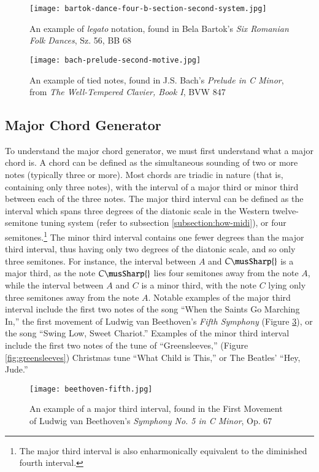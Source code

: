 \begin{figure}[h]
  \centering
  \texttt{[image: bartok-dance-four-b-section-second-system.jpg]}
  \caption{An example of \textit{legato} notation, found in Bela Bartok's \textit{Six Romanian Folk Dances}, Sz. 56, BB 68}
  \label{fig:legato-notes-example}
\end{figure}

\begin{figure}[h]
  \centering
  \texttt{[image: bach-prelude-second-motive.jpg]}
  \caption{An example of tied notes, found in J.S. Bach's \textit{Prelude in C Minor}, from \textit{The Well-Tempered Clavier, Book I}, BVW 847}
  \label{fig:tied-notes-example}
\end{figure}

\subsection{Major Chord Generator}

To understand the major chord generator, we must first understand what a major chord is. A chord can be defined as the simultaneous sounding of two or more notes (typically three or more). Most chords are triadic in nature (that is, containing only three notes), with the interval of a major third or minor third between each of the three notes. The major third interval can be defined as the interval which spans three degrees of the diatonic scale in the Western twelve-semitone tuning system (refer to subsection \ref{subsection:how-midi}), or four semitones.\footnote{The major third interval is also enharmonically equivalent to the diminished fourth interval.} The minor third interval contains one fewer degrees than the major third interval, thus having only two degrees of the diatonic scale, and so only three semitones. For instance, the interval between $A$ and $C\musSharp{}$ is a major third, as the note $C\musSharp{}$ lies four semitones away from the note $A$, while the interval between $A$ and $C$ is a minor third, with the note $C$ lying only three semitones away from the note $A$. Notable examples of the major third interval include the first two notes of the song ``When the Saints Go Marching In,'' the first movement of Ludwig van Beethoven's \textit{Fifth Symphony} (Figure \ref{fig:beethoven-fifth}\cite{Beethoven_1862}), or the song ``Swing Low, Sweet Chariot.'' Examples of the minor third interval include the first two notes of the tune of ``Greensleeves,'' (Figure \ref{fig:greensleeves}\cite{Kurtz_2010}) Christmas tune ``What Child is This,'' or The Beatles' ``Hey, Jude.''
\begin{figure}
  \centering
  \texttt{[image: beethoven-fifth.jpg]}
  \caption{An example of a major third interval, found in the First Movement of Ludwig van Beethoven's \textit{Symphony No. 5 in C Minor}, Op. 67}
  \label{fig:beethoven-fifth}
\end{figure}

